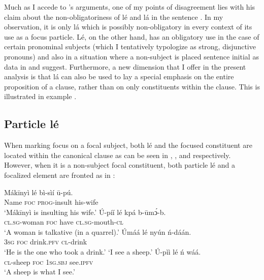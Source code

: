 \documentclass[output=paper,colorlinks,citecolor=brown]{langscibook}
\begin{document}
Much as I accede to \citeauthor{Schwarz2009}’s arguments, one of my points of disagreement lies with his claim about the non-obligatoriness of lé and lá in the sentence \citep[184--185]{Schwarz2009}. In my observation, it is only lá which is possibly non-obligatory in every context of its use as a focus particle. Lé, on the other hand, has an obligatory use in the case of certain pronominal subjects (which I tentatively typologize as strong, disjunctive pronouns) and also in a situation where a non-subject is placed sentence initial as data in  and  suggest. Furthermore, a new dimension that I offer in the present analysis is that lá can also be used to lay a special emphasis on the entire proposition of a clause, rather than on only constituents within the clause. This is illustrated in example .

\subsection{Particle lé}\label{sec:bisilki:7.1}

When marking focus on a focal subject, both lé and the focused constituent are located within the canonical clause as can be seen in , , and  respectively. However, when it is a non-subject focal constituent, both particle lé and a focalized element are fronted as in :

\ea%
    \label{ex:bisilki:22}
    \ea\label{ex:bisilki:22a}
    \gll    Mákīnyì	lé	bì-sìí	ū-pú.\\
            Name	\textsc{foc}	\textsc{prog-}insult		his-wife\\
    \glt    ‘Mákīnyì is insulting his wife.’
    \ex\label{ex:bisilki:22b}
    \gll    Ú-píí			lé	kpá	b-ūmͻ́-b.\\
            \textsc{cl.sg-}woman	\textsc{foc}	have	\textsc{cl.sg-}mouth\textsc{-cl}\\
    \glt    ‘A woman is talkative (in a quarrel).’
    \ex\label{ex:bisilki:22c}
    \gll    Úmáá		lé	nyún		ń-dáán.\\
            \textsc{3sg}		\textsc{foc}	drink\textsc{.pfv}	\textsc{cl-}drink\\
    \glt    ‘He is the one who took a drink.’
    \glt    ‘I see a sheep.’
    \ex\label{ex:bisilki:22e}
    \gll    Ú-pìì		lé	ń		wáá.\\
            \textsc{cl-}sheep	\textsc{foc}	\textsc{1sg.sbj}	see\textsc{.ipfv}\\
    \glt    ‘A sheep is what I see.’
    \z
\z
\end{document}
